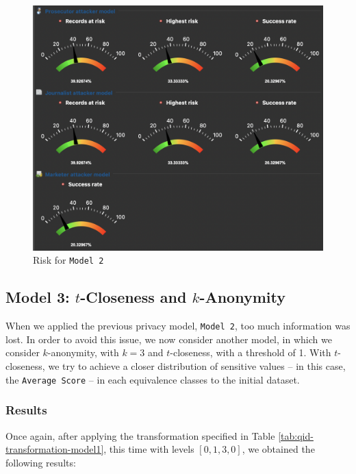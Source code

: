 \documentclass[a4paper, 11pt]{article}
\begin{document}
\begin{figure}[H]
	\centering
	\includegraphics[width=.9\textwidth]{img/risk-model2.png}
	\caption{Risk for \texttt{Model 2}}
	\label{fig:model2-risk}
\end{figure}

\pagebreak

\subsection{Model 3: $t$-Closeness and $k$-Anonymity}

When we applied the previous privacy model, \texttt{Model 2}, too much 
information was lost. In order to avoid this issue, we now consider another 
model, in which we consider $k$-anonymity, with $k=3$ and $t$-closeness, with a 
threshold of 1. With $t$-closeness, we try to achieve a closer distribution of 
sensitive values -- in this case, the \texttt{Average Score} -- in each 
equivalence classes to the initial dataset.

\subsubsection{Results}

Once again, after applying the transformation specified in Table 
\ref{tab:qid-transformation-model1}, this time with levels $[0,1,3,0]$, we 
obtained the following results:
\end{document}
